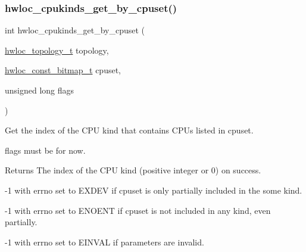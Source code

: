 \subsubsection{\texorpdfstring{hwloc\+\_\+cpukinds\+\_\+get\+\_\+by\+\_\+cpuset()}{hwloc\_cpukinds\_get\_by\_cpuset()}}
{\footnotesize\ttfamily int hwloc\+\_\+cpukinds\+\_\+get\+\_\+by\+\_\+cpuset (\begin{DoxyParamCaption}\item[{\hyperlink{a00186_ga9d1e76ee15a7dee158b786c30b6a6e38}{hwloc\+\_\+topology\+\_\+t}}]{topology,  }\item[{\hyperlink{a00205_gae991a108af01d408be2776c5b2c467b2}{hwloc\+\_\+const\+\_\+bitmap\+\_\+t}}]{cpuset,  }\item[{unsigned long}]{flags }\end{DoxyParamCaption})}



Get the index of the C\+PU kind that contains C\+P\+Us listed in {\ttfamily cpuset}. 

{\ttfamily flags} must be {} for now.

\begin{DoxyReturn}{Returns}
The index of the C\+PU kind (positive integer or 0) on success. 

{\ttfamily -\/1} with {\ttfamily errno} set to {\ttfamily E\+X\+D\+EV} if {\ttfamily cpuset} is only partially included in the some kind. 

{\ttfamily -\/1} with {\ttfamily errno} set to {\ttfamily E\+N\+O\+E\+NT} if {\ttfamily cpuset} is not included in any kind, even partially. 

{\ttfamily -\/1} with {\ttfamily errno} set to {\ttfamily E\+I\+N\+V\+AL} if parameters are invalid. 
\end{DoxyReturn}
\mbox{\label{a00213_gae1b38fbe9c645583fc16052ce6fbb275}} 
